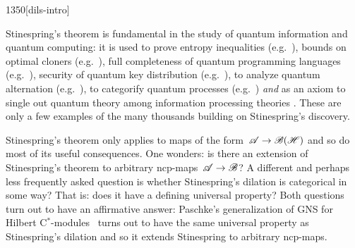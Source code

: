 \begin{parsec}{1350}[dils-intro]
\begin{point}{50}%
Stinespring's theorem
is fundamental in the study
of quantum information and quantum computing:
it is used to prove entropy inequalities (e.g.~\cite{lindblad}),
bounds on optimal cloners (e.g.~\cite{werner}),
full completeness of quantum programming languages (e.g.~\cite{staton}),
security of quantum key distribution (e.g.~\cite{werner2,kissinger2017picture}),
to analyze quantum alternation (e.g.~\cite{prakash}),
to categorify quantum processes (e.g.~\cite{selinger}) \emph{and}
as an axiom to single out
quantum theory among information processing theories \cite{chiribella}.
These are only a few examples
    of the many thousands building on Stinespring's discovery.

Stinespring's theorem only applies
to maps of the form~$\mathscr{A} \to \mathscr{B}(\mathscr{H})$
    and so do most of its useful consequences.
One wonders:
    is there an extension of Stinespring's theorem
    to arbitrary ncp-maps~$\mathscr{A} \to \mathscr{B}$?
A different and perhaps less frequently asked question is whether
     Stinespring's dilation is categorical in some way?
That is: does it have a defining universal property?
Both questions turn out to have an affirmative answer:
Paschke's generalization of GNS for Hilbert C$^*$-modules~\cite{paschke}
    turns out to have the same universal property
        as Stinespring's dilation and so it extends Stinespring
        to arbitrary ncp-maps.


\end{point}
\end{parsec}

